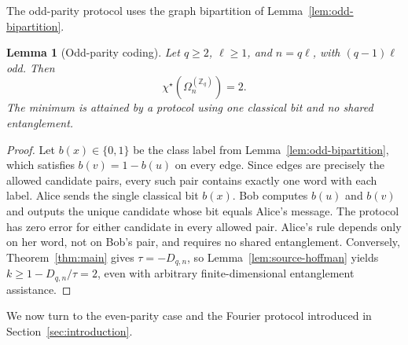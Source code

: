 \documentclass[11pt,a4paper]{article}
\numberwithin{equation}{section}
\numberwithin{figure}{section}
\numberwithin{table}{section}
\numberwithin{footnote}{section}
\newtheorem{lemma}[theorem]{Lemma}
\theoremstyle{informal}\newtheorem*{informaltheorem}{Informal theorem}
\theoremstyle{definition}\newtheorem{example}{Example}[section]
\theoremstyle{remark}\newtheorem{remark}[theorem]{Remark}
\newcommand{\Z}{\mathbb Z}
\newcommand{\chs}{\chi^{\star}}
\newcommand{\Om}{\Omega_n^{(\Z_q)}}
\begin{document}
The odd-parity protocol uses the graph bipartition of
Lemma~\ref{lem:odd-bipartition}.

\begin{lemma}[Odd-parity coding]\label{lem:odd-source-coding}
Let \(q\geq2\), \(\ell\geq1\), and \(n=q\ell\), with
\((q-1)\ell\) odd. Then
\begin{equation}
 \chs(\Om)=2.
\end{equation}
The minimum is attained by a protocol using one classical bit and
no shared entanglement.
\end{lemma}
\begin{proof}
Let \(b(x)\in\{0,1\}\) be the class label from
Lemma~\ref{lem:odd-bipartition}, which satisfies \(b(v)=1-b(u)\)
on every edge.
Since edges are precisely the allowed candidate pairs, every such
pair contains exactly one word with each label.
Alice sends the single classical bit \(b(x)\). Bob computes
\(b(u)\) and \(b(v)\) and outputs the unique candidate whose bit
equals Alice's message. The protocol has zero error for either
candidate in every allowed pair. Alice's rule depends only on her
word, not on Bob's pair, and requires no shared entanglement.
Conversely, Theorem~\ref{thm:main} gives
\(\tau=-D_{q,n}\), so Lemma~\ref{lem:source-hoffman} yields
\(k\geq1-D_{q,n}/\tau=2\), even with arbitrary
finite-dimensional entanglement assistance.
\end{proof}

We now turn to the even-parity case and the Fourier protocol
introduced in Section~\ref{sec:introduction}.
\end{document}
